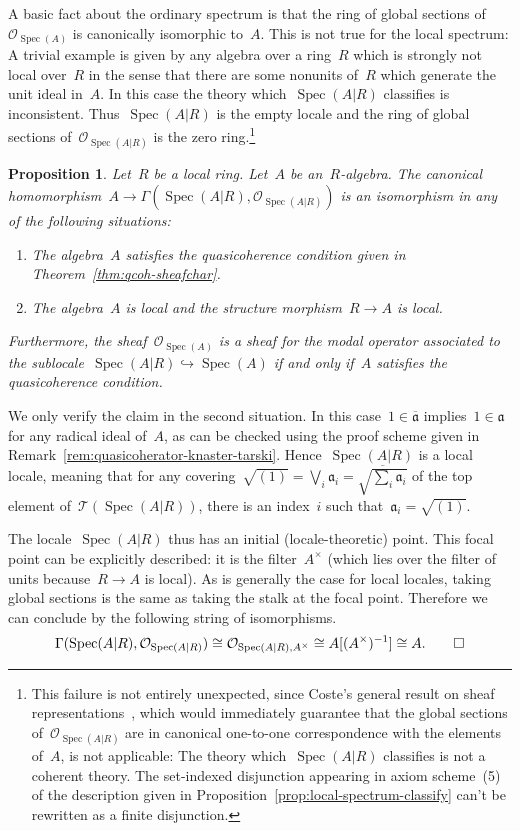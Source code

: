 \documentclass[10pt,reqno,a4paper]{amsbook}
\makeatletter
\theoremstyle{definition}
\theoremstyle{plain}
\newtheorem{prop}[defn]{Proposition}
\theoremstyle{remark}
\renewcommand{\O}{\mathcal{O}}
\newcommand{\T}{\mathcal{T}}
\newcommand{\aaa}{\mathfrak{a}}
\DeclareMathOperator{\Spec}{Spec}
\newcommand{\Open}{\T}
\newcommand{\?}{\,{:}\,}
\renewcommand{\_}{\mathpunct{.}\,}
\renewenvironment{proof}[1][\proofname]{\par
  \pushQED{\qed}%
  \normalfont \topsep6\p@\@plus6\p@\relax
  \trivlist
  \item[\hskip\labelsep
        \itshape
    #1\@addpunct{.}]\ignorespaces
}{%
  \popQED\endtrivlist\@endpefalse
}
\makeatother
\begin{document}
A basic fact about the ordinary spectrum is that the ring of global sections
of~$\O_{\Spec(A)}$ is canonically isomorphic to~$A$. This is not true for the
local spectrum: A trivial example is given by any algebra over a
ring~$R$ which is strongly not local over~$R$ in the sense that there are some nonunits
of~$R$ which generate the unit ideal in~$A$.
In this case the theory which~$\Spec(A|R)$ classifies is
inconsistent. Thus~$\Spec(A|R)$ is the empty locale and the ring of global
sections of~$\O_{\Spec(A|R)}$ is the zero ring.\footnote{This failure is not
entirely unexpected, since Coste's general result on sheaf
representations~\cite[Theorem~5.1.1]{coste:sheaf-representation}, which would
immediately guarantee that the global sections of~$\O_{\Spec(A|R)}$ are in
canonical one-to-one correspondence with the elements of~$A$, is not
applicable: The theory which~$\Spec(A|R)$ classifies is not a coherent
theory. The set-indexed disjunction appearing in axiom scheme~(5) of the
description given in Proposition~\ref{prop:local-spectrum-classify} can't be
rewritten as a finite disjunction.}

\begin{prop}\label{prop:local-spectrum-global-functions}
Let~$R$ be a local ring. Let~$A$ be an~$R$-algebra. The canonical
homomorphism~$A \to \Gamma(\Spec(A|R), \O_{\Spec(A|R)})$ is an isomorphism in
any of the following situations:
\begin{enumerate}
\item The algebra~$A$ satisfies the quasicoherence condition given in
Theorem~\ref{thm:qcoh-sheafchar}.
\item The algebra~$A$ is local and the structure morphism~$R \to A$ is local.
\end{enumerate}
Furthermore, the sheaf~$\O_{\Spec(A)}$ is a sheaf
for the modal operator associated to the sublocale~$\Spec(A|R) \hookrightarrow
\Spec(A)$ if and only if~$A$ satisfies the quasicoherence condition.
\end{prop}

\begin{proof}We only verify the claim in the second situation. In this
case~$1 \in \overline{\aaa}$ implies~$1 \in \aaa$ for any radical ideal of~$A$,
as can be checked using the proof scheme given in
Remark~\ref{rem:quasicoherator-knaster-tarski}.
Hence~$\Spec(A|R)$ is a local locale, meaning that for any covering~$\sqrt{(1)}
= \bigvee_i \aaa_i = \overline{\sqrt{\sum_i \aaa_i}}$ of the top element
of~$\Open(\Spec(A|R))$, there is an index~$i$ such that~$\aaa_i = \sqrt{(1)}$.

The locale~$\Spec(A|R)$ thus has an initial (locale-theoretic) point. This
focal point can be explicitly described: it is the filter~$A^\times$ (which
lies over the filter of units because~$R \to A$ is local). As is generally the
case for local locales, taking global sections is the same as taking the stalk
at the focal point. Therefore we can conclude by the following string of
isomorphisms.
\[ \Gamma(\Spec(A|R), \O_{\Spec(A|R)}) \cong
  \O_{\Spec(A|R), A^\times} \cong
  A[(A^\times)^{-1}] \cong
  A. \qedhere \]
\end{proof}
\end{document}
